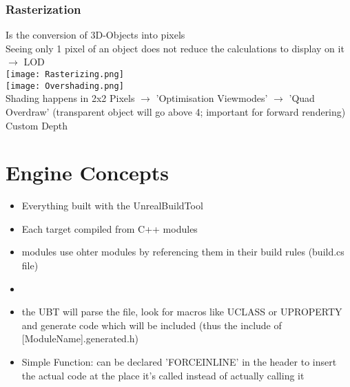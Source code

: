 \documentclass{scrbook}
\begin{document}
            
            \subsection{Rasterization}
                Is the conversion of 3D-Objects into pixels \\
                Seeing only 1 pixel of an object does not reduce the calculations to display on it $\rightarrow$ LOD \\
                \texttt{[image: Rasterizing.png]} \\
                \texttt{[image: Overshading.png]} \\
                Shading happens in 2x2 Pixels $\rightarrow$ 
                'Optimisation Viewmodes' $\rightarrow$ 'Quad Overdraw'  (transparent object will go above 4; important for forward rendering)\\
                Custom Depth \\


    \chapter{Engine Concepts}
        \begin{itemize}
            \item Everything built with the UnrealBuildTool
            \item Each target compiled from C++ modules
            \item modules use ohter modules by referencing them in their build rules (build.cs file)
            \item 
            \item the UBT will parse the file, look for macros like UCLASS or UPROPERTY and generate code which will be included (thus the include of [ModuleName].generated.h)
            \item Simple Function: can be declared 'FORCEINLINE' in the header to insert the actual code at the place it's called instead of actually calling it
        \end{itemize}
\end{document}
